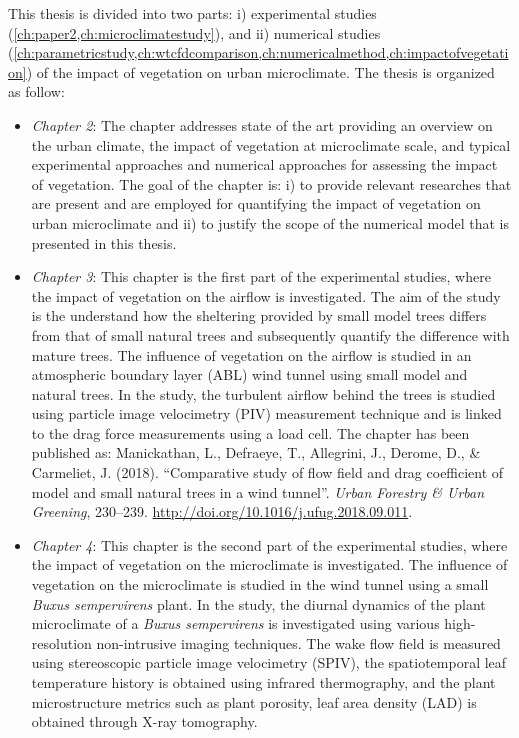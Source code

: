 This thesis is divided into two parts: i) experimental studies (\cref{ch:paper2,ch:microclimatestudy}), and ii) numerical studies (\cref{ch:parametricstudy,ch:wtcfdcomparison,ch:numericalmethod,ch:impactofvegetation}) of the impact of vegetation on urban microclimate. The thesis is organized as follow:
\begin{itemize}
	\item \textit{Chapter 2}: The chapter addresses state of the art providing an overview on the urban climate, the impact of vegetation at microclimate scale, and typical experimental approaches and numerical approaches for assessing the impact of vegetation. The goal of the chapter is: i) to provide relevant researches that are present and are employed for quantifying the impact of vegetation on urban microclimate and ii) to justify the scope of the numerical model that is presented in this thesis. 

	\item \textit{Chapter 3}: This chapter is the first part of the experimental studies, where the impact of vegetation on the airflow is investigated. The aim of the study is the understand how the sheltering provided by small model trees differs from that of small natural trees and subsequently quantify the difference with mature trees. The influence of vegetation on the airflow is studied in an atmospheric boundary layer (ABL) wind tunnel using small model and natural trees. In the study, the turbulent airflow behind the trees is studied using particle image velocimetry (PIV) measurement technique and is linked to the drag force measurements using a load cell. The chapter has been published as: Manickathan, L., Defraeye, T., Allegrini, J., Derome, D., \& Carmeliet, J. (2018). ``Comparative study of flow field and drag coefficient of model and small natural trees in a wind tunnel''. \textit{Urban Forestry \& Urban Greening}, 230–239. \url{http://doi.org/10.1016/j.ufug.2018.09.011}.	

	\item \textit{Chapter 4}: This chapter is the second part of the experimental studies, where the impact of vegetation on the microclimate is investigated. The influence of vegetation on the microclimate is studied in the wind tunnel using a small \textit{Buxus sempervirens} plant. In the study, the diurnal dynamics of the plant microclimate of a \textit{Buxus sempervirens} is investigated using various high-resolution non-intrusive imaging techniques. The wake flow field is measured using stereoscopic particle image velocimetry (SPIV), the spatiotemporal leaf temperature history is obtained using infrared thermography, and the plant microstructure metrics such as plant porosity, leaf area density (LAD) is obtained through X-ray tomography.


\end{itemize}
